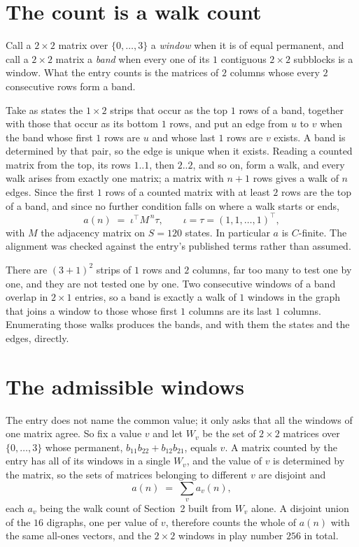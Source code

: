 \documentclass[11pt,a4paper]{article}
\theoremstyle{plain}
\theoremstyle{definition}
\begin{document}
\section{The count is a walk count}

Call a $2\times2$ matrix over $\{0,\dots,3\}$ a \emph{window} when it is of equal permanent, and
call a $2\times2$ matrix a \emph{band} when every one of its $1$ contiguous
$2\times2$ subblocks is a window. What the entry counts is the matrices of $2$ columns
whose every $2$ consecutive rows form a band.

Take as states the $1\times2$ strips that occur as the top $1$ rows of a band,
together with those that occur as its bottom $1$ rows, and put an edge from $u$ to $v$
when the band whose first $1$ rows are $u$ and whose last $1$ rows are $v$ exists.
A band is determined by that pair, so the edge is unique when it exists. Reading a counted
matrix from the top, its rows $1..1$, then $2..2$, and so on, form a walk, and every
walk arises from exactly one matrix; a matrix with $n+1$ rows gives a walk of $n$ edges.
Since the first $1$ rows of a counted matrix with at least $2$ rows are the top of a
band, and since no further condition falls on where a walk starts or ends,
\[
a(n)\;=\;\iota^{\!\top}M^{\,n}\tau ,\qquad \iota=\tau=(1,1,\dots,1)^{\!\top},
\]
with $M$ the adjacency matrix on $S=120$ states. In particular $a$ is $C$-finite. The
alignment was checked against the entry's published terms rather than assumed.

There are $(3 + 1)^{2}$ strips of $1$ rows and $2$ columns, far too
many to test one by one, and they are not tested one by one. Two consecutive windows of a band
overlap in $2\times1$ entries, so a band is exactly a walk of $1$ windows in
the graph that joins a window to those whose first $1$ columns are its last $1$
columns. Enumerating those walks produces the bands, and with them the states and the edges,
directly.

\section{The admissible windows}

The entry does not name the common value; it only asks that all the windows of one matrix agree.
So fix a value $v$ and let $W_v$ be the set of $2\times2$ matrices over
$\{0,\dots,3\}$ whose permanent, $b_{11}b_{22}+b_{12}b_{21}$, equals $v$. A matrix counted by the entry has all of
its windows in a single $W_v$, and the value of $v$ is determined by the matrix, so the sets of
matrices belonging to different $v$ are disjoint and
\[
a(n)\;=\;\sum_v a_v(n),
\]
each $a_v$ being the walk count of Section~2 built from $W_v$ alone. A disjoint union of the
$16$ digraphs, one per value of $v$, therefore counts the whole of $a(n)$ with the same
all-ones vectors, and the $2\times2$ windows in play number $256$ in total.
\end{document}
